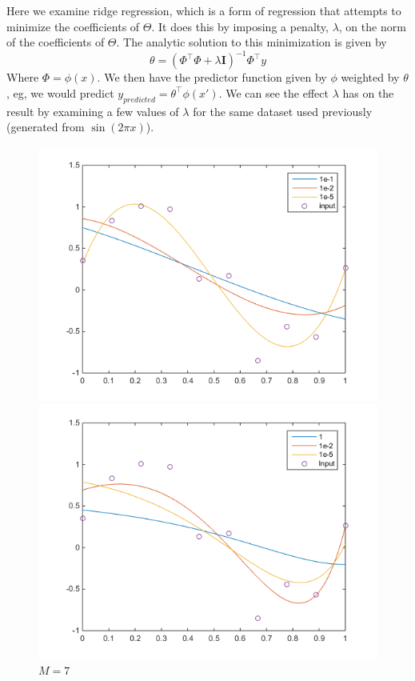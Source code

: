 \documentclass[11pt,letterpaper]{article}
\begin{document}
Here we examine ridge regression, which is a form of regression that attempts to minimize the coefficients of $\Theta$. It does this by imposing a penalty, $\lambda$, on the norm of the coefficients of $\Theta$. The analytic solution to this minimization is given by
\[ \theta = (\Phi^\intercal \Phi + \lambda \mathbf{I})^{-1}\Phi^\intercal y \]
Where $\Phi = \phi(x)$. We then have the predictor function given by $\phi$ weighted by $\theta$, eg, we would predict $y_{predicted} = \theta^\intercal \phi(x')$. We can see the effect $\lambda$ has on the result by examining a few values of $\lambda$ for the same dataset used previously (generated from $\sin(2\pi x)$).
\begin{figure}[!htb]
  \includegraphics[width=\linewidth]{figures/M3.png}
  \caption{$M=3$}\label{fig:M3}
\endminipage\hfill
{}
  \includegraphics[width=\linewidth]{figures/M7.png}
  \caption{$M=7$}\label{fig:M7}
\endminipage
\end{figure}
\end{document}
